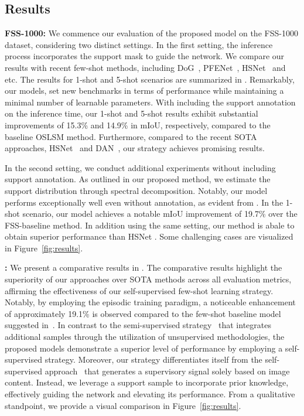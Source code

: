 \documentclass[runningheads]{llncs}
\begin{document}
\subsection{Results}
\textbf{FSS-1000:} We commence our evaluation of the proposed model on the FSS-1000 dataset, considering two distinct settings. In the first setting, the inference process incorporates the support mask to guide the network. We compare our results with recent few-shot methods, including 
DoG~\cite{azad2021texture}, PFENet~\cite{tian2020prior}, HSNet~\cite{min2021hypercorrelation} and etc. The results for 1-shot and 5-shot scenarios are summarized in . Remarkably, our models, set new benchmarks in terms of performance while maintaining a minimal number of learnable parameters. With including the support annotation on the inference time, our 1-shot and 5-shot results exhibit substantial improvements of 15.3\% and 14.9\% in mIoU, respectively, compared to the baseline OSLSM method. Furthermore, compared to the recent SOTA approaches, HSNet~\cite{min2021hypercorrelation} and DAN~\cite{wang2020few}, our strategy achieves promising results.


In the second setting, we conduct additional experiments without including support annotation. As outlined in our proposed method, we estimate the support distribution through spectral decomposition. Notably, our model performs exceptionally well even without annotation, as evident from . In the 1-shot scenario, our model achieves a notable mIoU improvement of 19.7\% over the FSS-baseline method. In addition using the same setting, our method is abale to obtain superior performance than HSNet \cite{min2021hypercorrelation}. Some challenging cases are visualized in Figure~\ref{fig:results}.




\noindent\textbf{:} We present a comparative results in . The comparative results highlight the superiority of our approaches over SOTA methods across all evaluation metrics, affirming the effectiveness of our self-supervised few-shot learning strategy. 
Notably, by employing the episodic training paradigm, a noticeable enhancement of approximately 19.1\% is observed compared to the few-shot baseline model suggested in~\cite{feyjie2020semi}. In contrast to the semi-supervised strategy~\cite{feyjie2020semi} that integrates additional samples through the utilization of unsupervised methodologies, the proposed models demonstrate a superior level of performance by employing a self-supervised strategy.
Moreover, our strategy differentiates itself from the self-supervised approach~\cite{ahn2021spatial,karimijafarbigloo2023ms} that generates a supervisory signal solely based on image content. Instead, we leverage a support sample to incorporate prior knowledge, effectively guiding the network and elevating its performance.
From a qualitative standpoint, we provide a visual comparison in Figure~\ref{fig:results}. 
\end{document}
